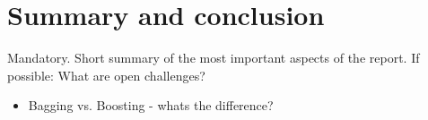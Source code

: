\section{Summary and conclusion}
Mandatory. Short summary of the most important aspects of the report.
If possible: What are open challenges?

\begin{itemize}
    \item Bagging vs. Boosting - whats the difference?
\end{itemize}

%
%
%
%
